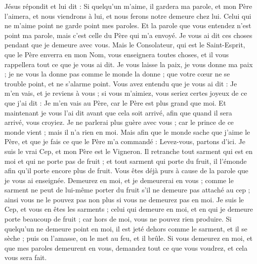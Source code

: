 \begin{multicols}{2}
Jésus répondit et lui dit : Si quelqu'un m'aime, il gardera ma parole, et mon Père l'aimera, et nous viendrons à lui, et nous ferons notre demeure chez lui.
Celui qui ne m'aime point ne garde point mes paroles. Et la parole que vous entendez n'est point ma parole, mais c'est celle du Père qui m'a envoyé.
Je vous ai dit ces choses pendant que je demeure avec vous.
Mais le Consolateur, qui est le Saint-Esprit, que le Père enverra en mon Nom, vous enseignera toutes choses, et il vous rappellera tout ce que je vous ai dit.
Je vous laisse la paix, je vous donne ma paix ; je ne vous la donne pas comme le monde la donne ; que votre cœur ne se trouble point, et ne s'alarme point.
Vous avez entendu que je vous ai dit : Je m'en vais, et je reviens à vous ; si vous m'aimiez, vous seriez certes joyeux de ce que j'ai dit : Je m'en vais au Père, car le Père est plus grand que moi.
Et maintenant je vous l'ai dit avant que cela soit arrivé, afin que quand il sera arrivé, vous croyiez.
Je ne parlerai plus guère avec vous ; car le prince de ce monde vient ; mais il n'a rien en moi.
Mais afin que le monde sache que j'aime le Père, et que je fais ce que le Père m'a commandé : Levez-vous, partons d'ici.
\VerseOne{}Je suis le vrai Cep, et mon Père est le Vigneron.
Il retranche tout sarment qui est en moi et qui ne porte pas de fruit ; et tout sarment qui porte du fruit, il l'émonde afin qu'il porte encore plus de fruit.
Vous êtes déjà purs à cause de la parole que je vous ai enseignée.
Demeurez en moi, et je demeurerai en vous ; comme le sarment ne peut de lui-même porter du fruit s'il ne demeure pas attaché au cep ; ainsi vous ne le pouvez pas non plus si vous ne demeurez pas en moi.
Je suis le Cep, et vous en êtes les sarments ; celui qui demeure en moi, et en qui je demeure porte beaucoup de fruit ; car hors de moi, vous ne pouvez rien produire.
Si quelqu'un ne demeure point en moi, il est jeté dehors comme le sarment, et il se sèche ; puis on l'amasse, on le met au feu, et il brûle.
Si vous demeurez en moi, et que mes paroles demeurent en vous, demandez tout ce que vous voudrez, et cela vous sera fait.

\end{multicols}
